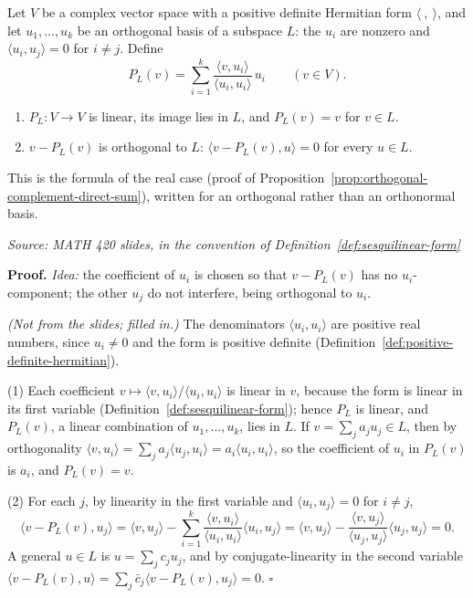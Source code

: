 \documentclass[11pt]{report}
\renewenvironment{proof}[1][Proof]{\noindent\textbf{#1.} }{\hfill$\square$\par\vspace{5pt}}
\newcommand{\srcline}[1]{\par\hfill{\footnotesize\textit{Source: #1}}}
\begin{document}
\begin{propbox}\label{prop:orthogonal-projection-hermitian}
Let $V$ be a complex vector space with a positive definite Hermitian form $\langle\ ,\ \rangle$, and let $u_1, \ldots, u_k$ be an orthogonal basis of a subspace $L$: the $u_i$ are nonzero and $\langle u_i, u_j \rangle = 0$ for $i \neq j$. Define
\[ P_L(v) = \sum_{i=1}^k \frac{\langle v, u_i \rangle}{\langle u_i, u_i \rangle}\, u_i \qquad (v \in V). \]
\begin{enumerate}
    \item $P_L: V \to V$ is linear, its image lies in $L$, and $P_L(v) = v$ for $v \in L$.
    \item $v - P_L(v)$ is orthogonal to $L$: $\langle v - P_L(v), u \rangle = 0$ for every $u \in L$.
\end{enumerate}
This is the formula of the real case (proof of Proposition~\ref{prop:orthogonal-complement-direct-sum}), written for an orthogonal rather than an orthonormal basis.
\srcline{MATH 420 slides, in the convention of Definition~\ref{def:sesquilinear-form}}
\end{propbox}

\begin{proof}
\textit{Idea:} the coefficient of $u_i$ is chosen so that $v - P_L(v)$ has no $u_i$-component; the other $u_j$ do not interfere, being orthogonal to $u_i$.\par
\textit{(Not from the slides; filled in.)} The denominators $\langle u_i, u_i \rangle$ are positive real numbers, since $u_i \neq 0$ and the form is positive definite (Definition~\ref{def:positive-definite-hermitian}).

(1) Each coefficient $v \mapsto \langle v, u_i \rangle / \langle u_i, u_i \rangle$ is linear in $v$, because the form is linear in its first variable (Definition~\ref{def:sesquilinear-form}); hence $P_L$ is linear, and $P_L(v)$, a linear combination of $u_1, \ldots, u_k$, lies in $L$. If $v = \sum_j a_j u_j \in L$, then by orthogonality $\langle v, u_i \rangle = \sum_j a_j \langle u_j, u_i \rangle = a_i \langle u_i, u_i \rangle$, so the coefficient of $u_i$ in $P_L(v)$ is $a_i$, and $P_L(v) = v$.

(2) For each $j$, by linearity in the first variable and $\langle u_i, u_j \rangle = 0$ for $i \neq j$,
\[ \langle v - P_L(v), u_j \rangle = \langle v, u_j \rangle - \sum_{i=1}^k \frac{\langle v, u_i \rangle}{\langle u_i, u_i \rangle} \langle u_i, u_j \rangle = \langle v, u_j \rangle - \frac{\langle v, u_j \rangle}{\langle u_j, u_j \rangle} \langle u_j, u_j \rangle = 0. \]
A general $u \in L$ is $u = \sum_j c_j u_j$, and by conjugate-linearity in the second variable $\langle v - P_L(v), u \rangle = \sum_j \bar c_j \langle v - P_L(v), u_j \rangle = 0$.
\end{proof}
\end{document}
